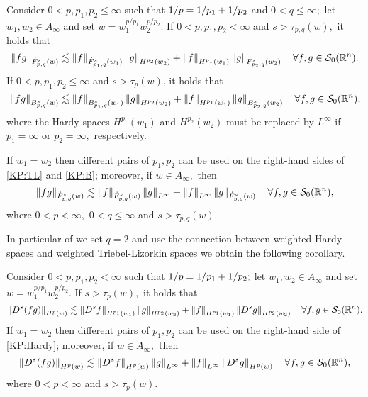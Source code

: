 \begin{corollary}\label{coro:KP:TL:B}  Consider  $0 < p, p_1, p_2  \le \infty$  such that $\hcline$ and  $0 < q \leq \infty;$ let  $w_1,w_2\in A_\infty$ and set $w=w_1^{{p}/{p_1}} w_2^{{p}/{p_2}}.$ 
If $0 < p ,p_1,p_2< \infty$ and  $s > \tau_{p,q}(w),$ it holds that
\begin{equation}\label{KP:TL}
\norm{fg}{\tlw{p}{s}{q}{w}} \lesssim \norm{f}{\tlw{p_1}{s}{q}{w_1}} \norm{g}{H^{p_2}(w_2)} +  \norm{f}{H^{p_1}(w_1)}   \norm{g}{\tlw{p_2}{s}{q}{w_2}} \quad \forall f, g \in \swz.
\end{equation}
If $0 < p, p_1,p_2 \le \infty$ and $s > \tau_p(w)$, it holds that
\begin{equation}\label{KP:B}
\norm{fg}{\besw{p}{s}{q}{w}} \lesssim \norm{f}{\besw{p_1}{s}{q}{w_1}} \norm{g}{H^{p_2}(w_2)} +  \norm{f}{H^{p_1}(w_1)}   \norm{g}{\besw{p_2}{s}{q}{w_2}} \quad \forall f, g \in \swz,
\end{equation}
where the Hardy spaces $H^{p_1}(w_1)$ and $H^{p_2}(w_2)$ must be replaced by $L^\infty$ if $p_1=\infty$ or $p_2=\infty,$ respectively.

If $w_1=w_2$ then different pairs of $p_1, p_2$ can be used on the right-hand sides of \eqref{KP:TL} and \eqref{KP:B}; moreover, if $w\in A_\infty,$ then 
\begin{equation}\label{KP:TL2}
\norm{fg}{\tlw{p}{s}{q}{w}} \lesssim \norm{f}{\tlw{p}{s}{q}{w}} \norm{g}{L^\infty} +  \norm{f}{L^\infty}   \norm{g}{\tlw{p}{s}{q}{w}} \quad \forall f, g \in \swz,
\end{equation}
where $0<p<\infty,$ $0<q\le \infty$ and $s>\tau_{p,q}(w).$
\end{corollary}

In particular of we set $q=2$ and use the connection between weighted Hardy spaces and weighted Triebel-Lizorkin spaces we obtain the following corollary. 

\begin{corollary}\label{coro:KP:Hardy} 
Consider  $0 < p, p_1, p_2  < \infty$  such that $\hcline;$ let  $w_1,w_2\in A_\infty$ and set $w=w_1^{{p}/{p_1}} w_2^{{p}/{p_2}}.$ 
If  $s > \tau_{p}(w),$ it holds that
\begin{equation}\label{KP:Hardy}
\norm{D^s(fg)}{H^p(w)} \lesssim \norm{D^s f}{H^{p_1}(w_1)} \norm{g}{H^{p_2}(w_2)} +  \norm{f}{H^{p_1}(w_1)}   \norm{D^s g}{H^{p_2}(w_2)} \quad \forall f, g \in \swz.
\end{equation}
If $w_1=w_2$ then different pairs of $p_1, p_2$ can be used on the right-hand side of \eqref{KP:Hardy}; moreover, if $w\in A_\infty,$ then 
\begin{equation*}
\norm{D^s(fg)}{H^p(w)} \lesssim \norm{D^s f}{H^{p}(w)} \norm{g}{L^\infty} +  \norm{f}{L^\infty}   \norm{D^s g}{H^{p}(w)} \quad \forall f, g \in \swz,
\end{equation*}
where $0<p<\infty$ and $s>\tau_{p}(w).$
\end{corollary}


